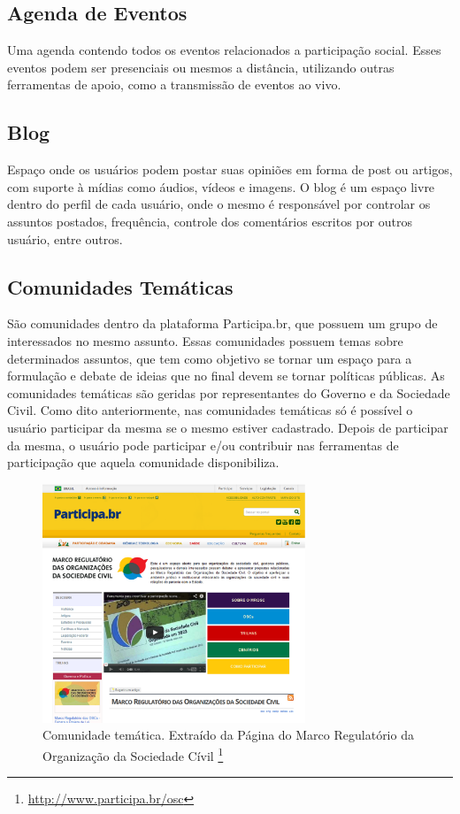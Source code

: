 \subsection{Agenda de Eventos}

Uma agenda contendo todos os eventos relacionados a participação social. Esses eventos podem ser presenciais ou mesmos a distância, utilizando outras ferramentas de apoio, como a transmissão de eventos ao vivo.

\subsection{Blog}

Espaço onde os usuários podem postar suas opiniões em forma de post ou artigos, com suporte à mídias como áudios, vídeos e imagens. O blog é um espaço livre dentro do perfil de cada usuário, onde o mesmo é responsável por controlar os assuntos postados, frequência, controle dos comentários escritos por outros usuário, entre outros.

\subsection{Comunidades Temáticas}

São comunidades dentro da plataforma Participa.br, que possuem um grupo de interessados no mesmo assunto. Essas comunidades possuem temas sobre determinados assuntos, que tem como objetivo se tornar um espaço para a formulação e debate de ideias que no final devem se tornar políticas públicas.
%
As comunidades temáticas são geridas por representantes do Governo e da Sociedade Civil. Como dito anteriormente, nas comunidades temáticas só é possível o usuário participar da mesma se o mesmo estiver cadastrado. Depois de participar da mesma, o usuário pode participar e/ou contribuir nas ferramentas de participação que aquela comunidade disponibiliza.

\graphicspath{{figuras/}}
\begin{figure}[H]
\centering
\includegraphics[width=0.7\textwidth]{comunidades-tematicas}
\caption{Comunidade temática. Extraído da Página do Marco Regulatório da Organização da Sociedade Cívil \footnote{\url{http://www.participa.br/osc}}}
\label{fig:rails-architecture}
\end{figure}


